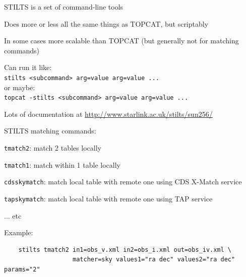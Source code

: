\documentclass[20pt,landscape]{foils}
\newcommand{\burl}[1]{{\color{blue}\url{#1}}}
\begin{document}
\vspace*{-0.2cm}
\begin{list0}
  \item STILTS is a set of command-line tools
  \begin{list2big}
    \item Does more or less all the same things as TOPCAT, but scriptably
    \item In some cases more scalable than TOPCAT
          (but generally not for matching commands)
    \item Can run it like:\\
          \hspace*{3em}
          {\color{brown}\verb|stilts <subcommand> arg=value arg=value ...|} \\
          or maybe: \\
          \hspace*{3em}
          {\color{brown}\verb|topcat -stilts <subcommand> arg=value arg=value ...|}
    \item Lots of documentation at
          \burl{http://www.starlink.ac.uk/stilts/sun256/}
  \end{list2big}
  \item STILTS matching commands:
  \begin{list2}
    \item[] {\color{brown}\tt tmatch2}: match 2 tables locally
    \item[] {\color{brown}\tt tmatch1}: match within 1 table locally
    \item[] {\color{brown}\tt cdsskymatch}: match local table with remote one
                                            using CDS X-Match service
    \item[] {\color{brown}\tt tapskymatch}: match local table with remote one
                                            using TAP service
    \item[] \hspace*{2em} ... etc
  \end{list2}
\vspace*{-0.2cm}
  \item Example: \\
\vspace*{-0.2cm}
        {\color{brown}\small
        \begin{verbatim}
    stilts tmatch2 in1=obs_v.xml in2=obs_i.xml out=obs_iv.xml \
                   matcher=sky values1="ra dec" values2="ra dec" params="2"
        \end{verbatim}}
\end{list0}
\end{document}
